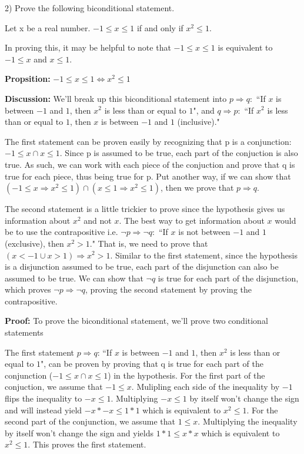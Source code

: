 	\begin{paragraph}{2)}
		Prove the following biconditional statement.
 		\begin{center}	
			Let x be a real number. $-1 \leq x \leq 1$ if and only if $x^2 \leq 1$.
		\end{center}
		In proving this, it may be helpful to note that $-1 \leq x \leq 1$ is equivalent to $-1 \leq x$ and $x \leq 1$. \spacing

		\separate\spacing

		\textbf{Propsition:} $-1 \leq x \leq 1 \iff x^2 \leq 1$ \spacing
		
		\textbf{Discussion:} We'll break up this biconditional statement
		into $p \Rightarrow q:$ ``If $x$ is between $-1$ and $1$, then $x^2$ is 
		less than or equal to $1$", and $q \Rightarrow p:$ ``If $x^2$ is less
		than or equal to $1$, then $x$ is between $-1$ and $1$ (inclusive)." \spacing

		\leftIndent The first statement can be proven easily 
		by recognizing that p is a conjunction: $-1 \leq x \cap x \leq 1$.
		Since p is assumed to be true, each part of the conjuction is also 
		true. As such, we can work with each piece of the conjuction and
		prove that q is true for each piece, thus being true for p.
		Put another way, if we can show that $(-1 \leq x \Rightarrow x^2 \leq 1) 
		\cap (x \leq 1 \Rightarrow x^2 \leq 1)$, then we prove that 
		$p \Rightarrow q$. \spacing

		\leftIndent The second statement is a little trickier to prove
		since the hypothesis gives us information about $x^2$ and not $x$.
		The best way to get information about $x$ would be to use the contrapositive
		i.e. $\neg p \Rightarrow \neg q:$ ``If $x$ is not between $-1$ and $1$ (exclusive),
		then $x^2 > 1$." That is, we need to prove that $(x < -1 \cup
		x > 1) \Rightarrow x^2 > 1.$ Similar to the first statement, 
		since the hypothesis is a disjunction assumed to be true, each
		part of the disjunction can also be assumed to be true. We can show that $\neg q$ is true
		for each part of the disjunction, which proves $\neg p \Rightarrow \neg q$, 
		proving the second statement by proving the contrapositive. \spacing


		\textbf{Proof:} To prove the biconditional statement, we'll prove 
		two conditional statements \spacing

		\leftIndent The first statement $p \Rightarrow q$: ``If $x$ is between $-1$ and $1$, then $x^2$ is 
		less than or equal to $1$", can be proven by proving that q is true for each part of 
		the conjunction ($-1 \leq x \cap x \leq 1$) in the hypothesis. For the first part of the conjuction,
		we assume that $-1 \leq x$. Mulipling each side of the 
		inequality by $-1$ flips the inequality to $-x \leq 1$.
		Multiplying $-x \leq 1$ by itself won't change the sign and will instead yield
		$-x * -x \leq 1 * 1$ which is equivalent to $x^2 \leq 1$. For the second part of the
		conjunction, we assume that $1 \leq x$. Multiplying the inequality by itself won't change the sign
		and yields $1 * 1 \leq x * x$ which is equivalent to $x^2 \leq 1$.
		This proves the first statement.\spacing


\end{paragraph}
